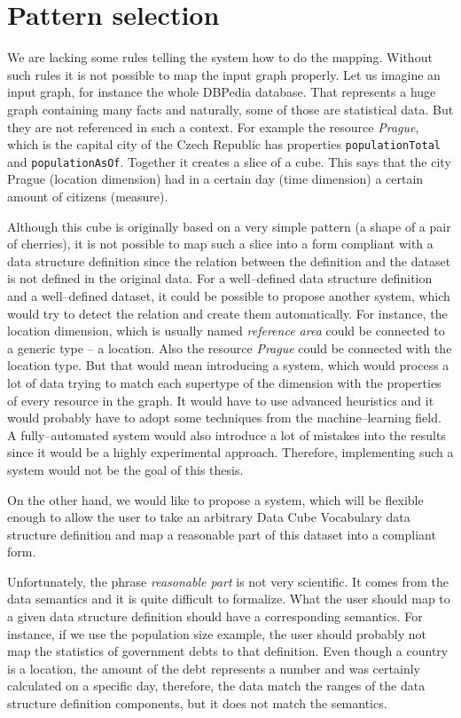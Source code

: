\section{Pattern selection}
We are lacking some rules telling the system how to do the mapping. 
Without such rules it is not possible to map the input graph properly. Let us 
imagine an input graph, for instance the whole DBPedia database. That represents a huge graph 
containing many facts and naturally, some of those are statistical data. But they 
are not referenced in such a context. For example the resource \emph{Prague}, which is the 
capital city of the Czech Republic has properties \texttt{populationTotal} and
\texttt{populationAsOf}. Together it creates a slice of a cube. This says that the 
city Prague (location dimension) had in a certain day (time dimension) 
a certain amount of citizens (measure).

Although this cube is originally based on a very simple pattern (a shape of a pair of cherries),
it is not possible to map such a slice into a form compliant with a 
data structure definition since the relation between the definition and the 
dataset is not defined in the original data. For a well--defined data structure 
definition and a well--defined dataset, it could be possible to propose another 
system, which would try to detect the relation and create them 
automatically. For instance, the location dimension, which is usually named
\emph{reference area} could be connected to a generic type -- a location.
Also the resource \emph{Prague} could be connected with the location type. But 
that would mean introducing a system, which would process a lot of data trying to 
match each supertype of the dimension with the properties of every resource in 
the graph. It would have to use advanced heuristics and it would probably have 
to adopt some techniques from the machine--learning field. A fully--automated 
system would also introduce a lot of mistakes into the results since it would 
be a highly experimental approach. Therefore, implementing such a system would 
not be the goal of this thesis. 

On the other hand, we would like to propose a system, which will be flexible 
enough to allow the user to take an arbitrary Data Cube Vocabulary data 
structure definition and map a reasonable part of this dataset into a compliant 
form.

Unfortunately, the phrase \emph{reasonable part} is not very scientific. 
It comes from the data semantics and it is quite difficult to formalize. What 
the user should map to a given data structure definition should have 
a corresponding semantics. For instance, if we use the population size example, the 
user should probably not map the statistics of government debts to that 
definition. Even though a country is a location, the amount of the debt represents a 
number and was certainly calculated on a specific day, therefore, the 
data match the ranges of the data structure definition components, but it does 
not match the semantics.

